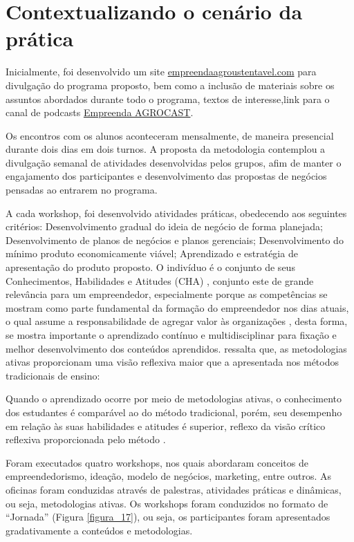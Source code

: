 \section{Contextualizando o cenário da prática}

Inicialmente, foi desenvolvido um site \href{http://www.empreendaagrosustentavel.com}{empreendaagroustentavel.com} para divulgação do programa proposto, bem como a inclusão de materiais sobre os assuntos abordados durante todo o programa, textos de interesse,link para o canal de podcasts \href{https://open.spotify.com/show/3c25hRSxvaCFPw6Y3lX3i1?si=9H_fGz_uRgGiFNhAcdr4rQ}{Empreenda AGROCAST}.

Os encontros com os alunos aconteceram mensalmente, de maneira presencial durante dois dias em dois turnos. A proposta da metodologia contemplou a divulgação semanal de atividades desenvolvidas pelos grupos, afim de manter o engajamento dos participantes e desenvolvimento das propostas de negócios pensadas ao entrarem no programa. 

A cada workshop, foi desenvolvido atividades práticas, obedecendo aos seguintes critérios: 
Desenvolvimento gradual do ideia de negócio de forma planejada; Desenvolvimento de planos de negócios e planos gerenciais; Desenvolvimento do mínimo produto economicamente viável; Aprendizado e estratégia de apresentação do produto proposto. O indivíduo é o conjunto de seus Conhecimentos, Habilidades e Atitudes (CHA) \cite{dutra_competencias:_2004}, conjunto este de grande relevância para um empreendedor, especialmente porque as competências se mostram como parte fundamental da formação do empreendedor nos dias atuais, o qual assume a responsabilidade de agregar valor às organizações \cite{ferreira_conhecimento_2019}, desta forma, se mostra importante o aprendizado contínuo e multidisciplinar para fixação e melhor desenvolvimento dos conteúdos aprendidos.  ressalta que, as metodologias ativas proporcionam uma visão reflexiva maior que a apresentada nos métodos tradicionais de ensino: 

\begin{citacao}
Quando o aprendizado ocorre por meio de metodologias ativas, o conhecimento dos estudantes é comparável ao do método tradicional, porém, seu desempenho em relação às suas habilidades e atitudes é superior, reflexo da visão crítico reflexiva proporcionada pelo método \cite{limberger_metodologias_2013}.
\end{citacao}


Foram executados quatro workshops, nos quais abordaram conceitos de empreendedorismo, ideação, modelo de negócios, marketing, entre outros. As oficinas foram conduzidas através de palestras, atividades práticas e dinâmicas, ou seja, metodologias ativas. Os workshops foram conduzidos no formato de “Jornada” (Figura \ref{figura_17}), ou seja, os participantes foram apresentados gradativamente a conteúdos e metodologias. 


